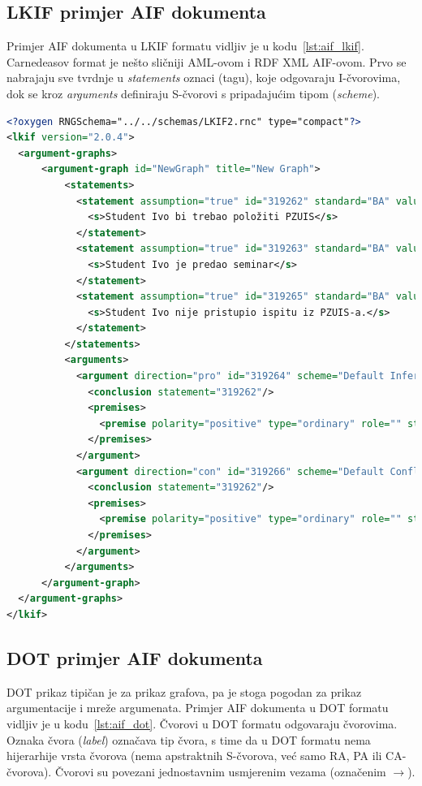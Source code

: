 \subsection{LKIF primjer AIF dokumenta}

Primjer AIF dokumenta u LKIF formatu vidljiv je u kodu~\ref{lst:aif_lkif}.
Carnedeasov format je nešto sličniji AML-ovom i RDF XML AIF-ovom. 
Prvo se nabrajaju sve tvrdnje u \emph{statements} oznaci (tagu), koje odgovaraju I-čvorovima, 
dok se kroz \emph{arguments} definiraju S-čvorovi s pripadajućim tipom (\emph{scheme}).

\lstset{language=XML}
\begin{lstlisting}[caption={Primjer AIF LKIF dokumenta},label={lst:aif_lkif},language=XML, captionpos=b]
<?oxygen RNGSchema="../../schemas/LKIF2.rnc" type="compact"?>
<lkif version="2.0.4">
  <argument-graphs>
      <argument-graph id="NewGraph" title="New Graph">
          <statements>
            <statement assumption="true" id="319262" standard="BA" value="unknown">
              <s>Student Ivo bi trebao položiti PZUIS</s>
            </statement>
            <statement assumption="true" id="319263" standard="BA" value="unknown">
              <s>Student Ivo je predao seminar</s>
            </statement>
            <statement assumption="true" id="319265" standard="BA" value="unknown">
              <s>Student Ivo nije pristupio ispitu iz PZUIS-a.</s>
            </statement>
          </statements>
          <arguments>
            <argument direction="pro" id="319264" scheme="Default Inference" weight="0.5">
              <conclusion statement="319262"/>
              <premises>
                <premise polarity="positive" type="ordinary" role="" statement="319263"/>
              </premises>
            </argument>
            <argument direction="con" id="319266" scheme="Default Conflict" weight="0.5">
              <conclusion statement="319262"/>
              <premises>
                <premise polarity="positive" type="ordinary" role="" statement="319265"/>
              </premises>
            </argument>
          </arguments>
      </argument-graph>
  </argument-graphs>
</lkif>
\end{lstlisting}

\subsection{DOT primjer AIF dokumenta}

DOT prikaz tipičan je za prikaz grafova, pa je stoga pogodan za prikaz
argumentacije i mreže argumenata. 
Primjer AIF dokumenta u DOT formatu vidljiv je u kodu~\ref{lst:aif_dot}.
Čvorovi u DOT formatu odgovaraju čvorovima. Oznaka čvora (\emph{label})
označava tip čvora, s time da u DOT formatu nema hijerarhije vrsta čvorova 
(nema apstraktnih S-čvorova, već samo RA, PA ili CA-čvorova). Čvorovi su
povezani jednostavnim usmjerenim vezama (označenim $\rightarrow$).

